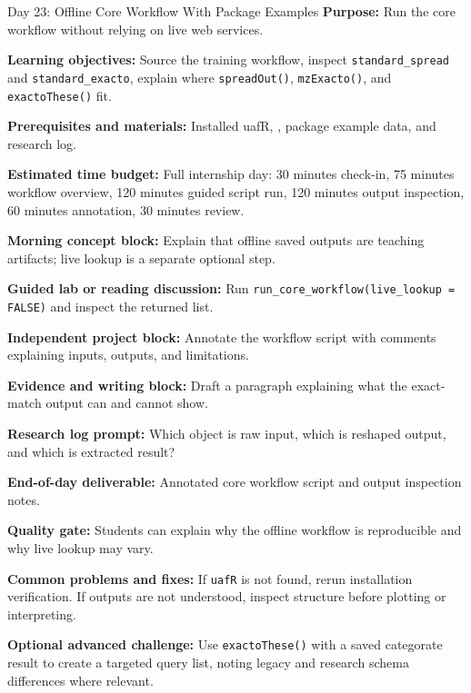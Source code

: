 \begin{dailybox}{Day 23: Offline Core Workflow With Package Examples}
\textbf{Purpose:} Run the core workflow without relying on live web services.

\textbf{Learning objectives:} Source the training workflow, inspect \texttt{standard\_spread} and \texttt{standard\_exacto}, explain where \texttt{spreadOut()}, \texttt{mzExacto()}, and \texttt{exactoThese()} fit.

\textbf{Prerequisites and materials:} Installed uafR, , package example data, and research log.

\textbf{Estimated time budget:} Full internship day: 30 minutes check-in, 75 minutes workflow overview, 120 minutes guided script run, 120 minutes output inspection, 60 minutes annotation, 30 minutes review.

\textbf{Morning concept block:} Explain that offline saved outputs are teaching artifacts; live lookup is a separate optional step.

\textbf{Guided lab or reading discussion:} Run \texttt{run\_core\_workflow(live\_lookup = FALSE)} and inspect the returned list.

\textbf{Independent project block:} Annotate the workflow script with comments explaining inputs, outputs, and limitations.

\textbf{Evidence and writing block:} Draft a paragraph explaining what the exact-match output can and cannot show.

\textbf{Research log prompt:} Which object is raw input, which is reshaped output, and which is extracted result?

\textbf{End-of-day deliverable:} Annotated core workflow script and output inspection notes.

\textbf{Quality gate:} Students can explain why the offline workflow is reproducible and why live lookup may vary.

\textbf{Common problems and fixes:} If \texttt{uafR} is not found, rerun installation verification. If outputs are not understood, inspect structure before plotting or interpreting.

\textbf{Optional advanced challenge:} Use \texttt{exactoThese()} with a saved categorate result to create a targeted query list, noting legacy and research schema differences where relevant.
\end{dailybox}


